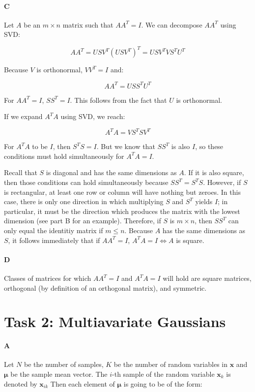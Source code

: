 \documentclass[12pt]{article}
\begin{document}
\paragraph{C}
Let $A$ be an $m \times n$ matrix such that $AA^T=I$. We can decompose $AA^T$ using SVD:

\[
AA^T = USV^T\left(USV^T\right)^T = USV^TVS^TU^T\]

Because $V$ is orthonormal, $VV^T=I$ and:

\[
AA^T = USS^TU^T
\]

For $AA^T=I$, $SS^T=I$. This follows from the fact that $U$ is orthonormal.

If we expand $A^TA$ using SVD, we reach:

\[
A^TA = VS^TSV^T
\]

For $A^TA$ to be $I$, then $S^TS=I$. But we know that $SS^T$ is also $I$, so these conditions must hold simultaneously for $A^TA=I$.

Recall that $S$ is diagonal and has the same dimensions as $A$. If it is also square, then those conditions can hold simultaneously because $SS^T=S^TS$. However, if $S$ is rectangular, at least one row or column will have nothing but zeroes. In this case, there is only one direction in which multiplying $S$ and $S^T$ yields $I$; in particular, it must be the direction which produces the matrix with the lowest dimension (see part B for an example). Therefore, if $S$ is $m \times n$, then $SS^T$ can only equal the identitiy matrix if $m \leq n$. Because $A$ has the same dimensions as $S$, it follows immediately that if $AA^T=I$, $A^TA=I \iff A$ is square.

\paragraph{D}
Classes of matrices for which $AA^T = I$ and $A^TA=I$ will hold are square matrices, orthogonal (by definition of an orthogonal matrix), and symmetric.

\section{Task 2: Multiavariate Gaussians}

\paragraph{A}
Let $N$ be the number of samples, $K$ be the number of random variables in $\mathbf{x}$ and $\mathbf{\mu}$ be the sample mean vector. The $i$-th sample of the random variable $\mathbf{x}_k$ is denoted by $\mathbf{x}_{ik}$ Then each element of $\mathbf{\mu}$ is going to be of the form:
\end{document}

